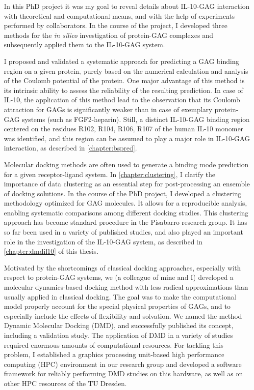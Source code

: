 In this PhD project it was my goal to reveal details about IL-10-GAG interaction
with theoretical and computational means, and with the help of experiments
performed by collaborators. In the course of the project, I developed three
methods for the \textit{in silico} investigation of protein-GAG complexes and
subsequently applied them to the IL-10-GAG system.

I proposed and validated a systematic approach for predicting a GAG binding
region on a given protein, purely based on the numerical calculation and
analysis of the Coulomb potential of the protein. One major advantage of this
method is its intrinsic ability to assess the reliability of the resulting
prediction. In case of IL-10, the application of this method lead to the
observation that its Coulomb attraction for GAGs is significantly weaker than in
case of exemplary protein-GAG systems (such as FGF2-heparin). Still, a distinct
IL-10-GAG binding region centered on the residues R102, R104, R106, R107 of the
human IL-10 monomer was identified, and this region can be assumed to play a
major role in IL-10-GAG interaction, as described in \cref{chapter:bspred}.

Molecular docking methods are often used to generate a binding mode prediction
for a given receptor-ligand system. In \cref{chapter:clustering}, I clarify the
importance of data clustering as an essential step for post-processing an
ensemble of docking solutions. In the course of the PhD project, I developed a
clustering methodology optimized for GAG molecules. It allows for a reproducible
analysis, enabling systematic comparisons among different docking studies. This
clustering approach has become standard procedure in the Pisabarro research
group. It has so far been used in a variety of published studies, and also
played an important role in the investigation of the IL-10-GAG system, as
described in \cref{chapter:dmdil10} of this thesis.

Motivated by the shortcomings of classical docking approaches, especially with
respect to protein-GAG systems, we (a colleague of mine and I) developed a
molecular dynamics-based docking method with less radical approximations than
usually applied in classical docking. The goal was to make the computational
model properly account for the special physical properties of GAGs, and to
especially include the effects of flexibility and solvation. We named the method
Dynamic Molecular Docking (DMD), and successfully published its concept,
including a validation study. The application of DMD in a variety of studies
required enormous amounts of computational resources. For tackling this problem,
I established a graphics processing unit-based high performance computing (HPC)
environment in our research group and developed a software framework for
reliably performing DMD studies on this hardware, as well as on other HPC
resources of the TU Dresden.



